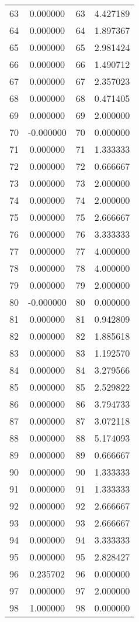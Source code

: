 \documentclass[12pt]{article}
\begin{document}
\begin{longtable}{@{}cccc@{}}
63 & 0.000000 & 63 & 4.427189 \\
64 & 0.000000 & 64 & 1.897367 \\
65 & 0.000000 & 65 & 2.981424 \\
66 & 0.000000 & 66 & 1.490712 \\
67 & 0.000000 & 67 & 2.357023 \\
68 & 0.000000 & 68 & 0.471405 \\
69 & 0.000000 & 69 & 2.000000 \\
70 & -0.000000 & 70 & 0.000000 \\
71 & 0.000000 & 71 & 1.333333 \\
72 & 0.000000 & 72 & 0.666667 \\
73 & 0.000000 & 73 & 2.000000 \\
74 & 0.000000 & 74 & 2.000000 \\
75 & 0.000000 & 75 & 2.666667 \\
76 & 0.000000 & 76 & 3.333333 \\
77 & 0.000000 & 77 & 4.000000 \\
78 & 0.000000 & 78 & 4.000000 \\
79 & 0.000000 & 79 & 2.000000 \\
80 & -0.000000 & 80 & 0.000000 \\
81 & 0.000000 & 81 & 0.942809 \\
82 & 0.000000 & 82 & 1.885618 \\
83 & 0.000000 & 83 & 1.192570 \\
84 & 0.000000 & 84 & 3.279566 \\
85 & 0.000000 & 85 & 2.529822 \\
86 & 0.000000 & 86 & 3.794733 \\
87 & 0.000000 & 87 & 3.072118 \\
88 & 0.000000 & 88 & 5.174093 \\
89 & 0.000000 & 89 & 0.666667 \\
90 & 0.000000 & 90 & 1.333333 \\
91 & 0.000000 & 91 & 1.333333 \\
92 & 0.000000 & 92 & 2.666667 \\
93 & 0.000000 & 93 & 2.666667 \\
94 & 0.000000 & 94 & 3.333333 \\
95 & 0.000000 & 95 & 2.828427 \\
96 & 0.235702 & 96 & 0.000000 \\
97 & 0.000000 & 97 & 2.000000 \\
98 & 1.000000 & 98 & 0.000000 \\

\end{longtable}
\end{document}
